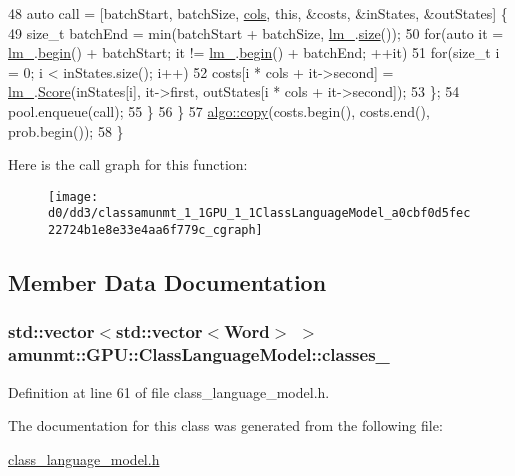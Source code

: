\begin{DoxyCode}
48           \textcolor{keyword}{auto} call = [batchStart, batchSize, \hyperlink{namespacemarian_ab9fbdcc76cc853270094524572584222}{cols}, \textcolor{keyword}{this}, &costs, &inStates, &outStates] \{
49             \textcolor{keywordtype}{size\_t} batchEnd = min(batchStart + batchSize, \hyperlink{classLanguageModel_a16259871203adfacf8617ecd5e29f6de}{lm\_}.\hyperlink{classLM_adee9e7617ec788bcf48ca57555aac428}{size}());
50             \textcolor{keywordflow}{for}(\textcolor{keyword}{auto} it = \hyperlink{classLanguageModel_a16259871203adfacf8617ecd5e29f6de}{lm\_}.\hyperlink{classLM_a04fc742595c0ac2642e3b700d329af83}{begin}() + batchStart; it != \hyperlink{classLanguageModel_a16259871203adfacf8617ecd5e29f6de}{lm\_}.\hyperlink{classLM_a04fc742595c0ac2642e3b700d329af83}{begin}() + batchEnd; ++it)
51               \textcolor{keywordflow}{for}(\textcolor{keywordtype}{size\_t} i = 0; i < inStates.size(); i++)
52                 costs[i * cols + it->second] = \hyperlink{classLanguageModel_a16259871203adfacf8617ecd5e29f6de}{lm\_}.\hyperlink{classLM_aefaa618805be0cdcfe1a358f5d6ed486}{Score}(inStates[i], it->first, outStates[i * cols
       + it->second]);
53           \};
54           pool.enqueue(call);
55         \}
56       \}
57       \hyperlink{namespaceamunmt_1_1GPU_1_1mblas_a6531a040aa422fcd149f89b92f6d2585}{algo::copy}(costs.begin(), costs.end(), prob.begin());
58     \}
\end{DoxyCode}


Here is the call graph for this function\+:
\nopagebreak
\begin{figure}[H]
\begin{center}
\leavevmode
\texttt{[image: d0/dd3/classamunmt\_1\_1GPU\_1\_1ClassLanguageModel\_a0cbf0d5fec22724b1e8e33e4aa6f779c\_cgraph]}
\end{center}
\end{figure}




\subsection{Member Data Documentation}
\subsubsection[{\texorpdfstring{classes\+\_\+}{classes_}}]{\setlength{\rightskip}{0pt plus 5cm}std\+::vector$<$std\+::vector$<${\bf Word}$>$ $>$ amunmt\+::\+G\+P\+U\+::\+Class\+Language\+Model\+::classes\+\_\+\hspace{0.3cm}{\ttfamily [private]}}\hypertarget{classamunmt_1_1GPU_1_1ClassLanguageModel_ad0a4765e122ba062501ef2112bcce7c0}{}\label{classamunmt_1_1GPU_1_1ClassLanguageModel_ad0a4765e122ba062501ef2112bcce7c0}


Definition at line 61 of file class\+\_\+language\+\_\+model.\+h.



The documentation for this class was generated from the following file\+:\begin{DoxyCompactItemize}
\item 
\hyperlink{class__language__model_8h}{class\+\_\+language\+\_\+model.\+h}\end{DoxyCompactItemize}
